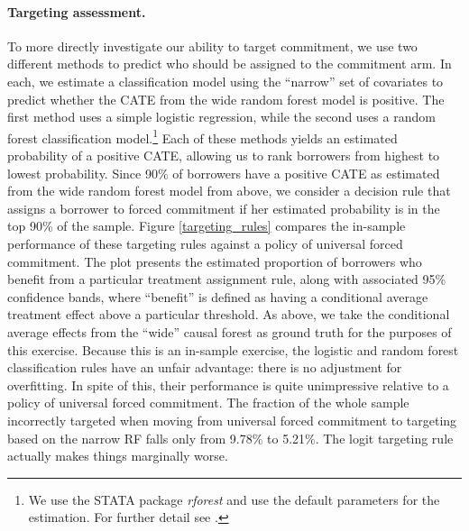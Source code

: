 \documentclass[oneside,11pt]{article}
\begin{document}
\paragraph{Targeting assessment.} 

To more directly investigate our ability to target commitment, we use two different methods to predict who should be assigned to the commitment arm. In each, we estimate a classification model using the ``narrow'' set of covariates to predict whether the CATE from the wide random forest model is positive. The first method uses a simple logistic regression, while the second uses a random forest classification model.\footnote{We use the STATA package \textit{rforest} and use the default parameters for the estimation. For further detail see \cite{rforest_stata}.} Each of these methods yields an estimated probability of a positive CATE, allowing us to rank borrowers from highest to lowest probability. Since 90\% of borrowers have a positive CATE as estimated from the wide random forest model from above, we consider a decision rule that assigns a borrower to forced commitment if her estimated probability is in the top 90\% of the sample.
Figure \ref{targeting_rules} compares the in-sample performance of these targeting rules against a policy of universal forced commitment. The plot presents the estimated proportion of borrowers who benefit from a particular treatment assignment rule, along with associated 95\% confidence bands, where ``benefit'' is defined as having a conditional average treatment effect above a particular threshold. As above, we take the conditional average effects from the ``wide'' causal forest as ground truth for the purposes of this exercise. 
Because this is an in-sample exercise, the logistic and random forest classification rules have an unfair advantage: there is no adjustment for overfitting.
In spite of this, their performance is quite unimpressive relative to a policy of universal forced commitment.
The fraction of the whole sample incorrectly targeted when moving from universal forced commitment to targeting based on the narrow RF falls only from 9.78\% to 5.21\%. The logit targeting rule actually makes things marginally worse. 
\end{document}
